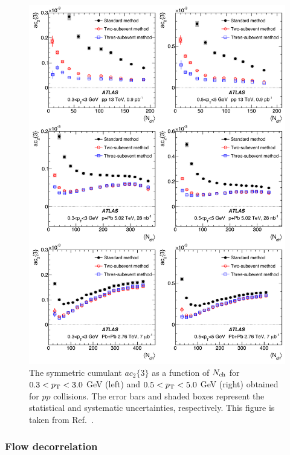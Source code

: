 \begin{figure}[H]
\centering
\includegraphics[width=.95\linewidth]{figs/chapter_subcumu/ATLAS_ac24_pp.pdf}
\caption{The symmetric cumulant $ac_2\{3\}$ as a function of $N_\text{ch}$ for $0.3<p_\text{T}<3.0$ GeV (left) and $0.5<p_\text{T}<5.0$ GeV (right) obtained for $pp$ collisions. The error bars and shaded boxes represent the statistical and systematic uncertainties, respectively. This figure is taken from Ref.~\cite{Aaboud:2018syf}.}
\label{fig:subcumu_ATLAS_ac24_pp}
\end{figure}



\subsubsection{Flow decorrelation}
\label{sec:flow_decorrelation}

